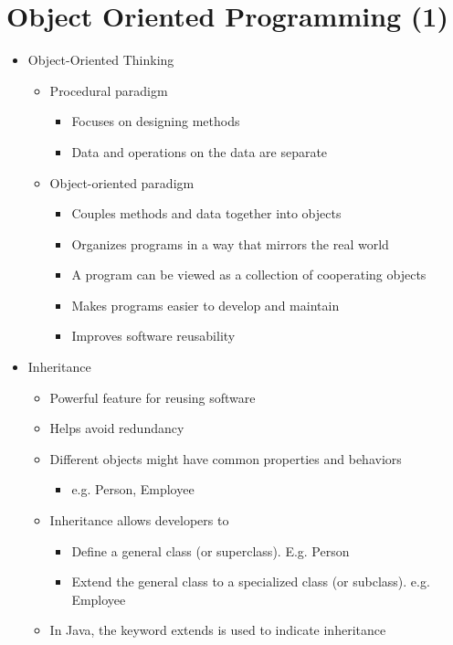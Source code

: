 \section{Object Oriented Programming (1)}
\begin{itemize}
	\item Object-Oriented Thinking
	\begin{itemize}
		\item Procedural paradigm
		\begin{itemize}
			\item Focuses on designing methods
			\item Data and operations on the data are separate
		\end{itemize}
		\item Object-oriented paradigm
		\begin{itemize}
			\item Couples methods and data together into objects
			\item Organizes programs in a way that mirrors the real world
			\item A program can be viewed as a collection of cooperating objects
			\item Makes programs easier to develop and maintain
			\item Improves software reusability
		\end{itemize}
	\end{itemize}

	\item Inheritance
	\begin{itemize}
		\item Powerful feature for reusing software
		\item Helps avoid redundancy
		\item Different objects might have common properties and behaviors
		\begin{itemize}
			\item e.g. Person, Employee
		\end{itemize}
		\item Inheritance allows developers to
		\begin{itemize}
			\item Define a general class (or superclass). E.g. Person
			\item Extend the general class to a specialized class (or subclass). e.g. Employee
		\end{itemize}
		\item In Java, the keyword extends is used to indicate inheritance
	\end{itemize}


\end{itemize}
